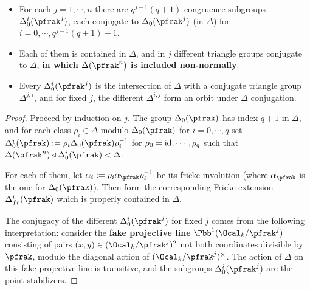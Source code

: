 \documentclass[11pt]{amsart}
\begin{document}
\begin{lemma}
	\begin{itemize}
		\item For each $j=1,\cdots,n$ there are $q^{j-1}(q+1)$ congruence subgroups $\Delta_0^i(\pfrak^j)$, each conjugate to $\Delta_0(\pfrak^j)$ (in $\Delta$) for $i=0,\cdots,q^{j-1}(q+1)-1$.
		\item  Each of them is contained in $\Delta$, and in $j$ different triangle groups conjugate to $\Delta$, \textbf{in which $\Delta(\pfrak^n)$ is included non-normally}.
		\item Every $\Delta_0^i(\pfrak^j)$ is the intersection of $\Delta$ with a conjugate triangle group $\Delta^{j,i}$, and for fixed $j$, the different $\Delta^{i,j}$ form an orbit under $\Delta$ conjugation.
	\end{itemize}
\end{lemma}
	\begin{proof}
		Proceed by induction on $j$. The group $\Delta_0(\pfrak)$ has index $q+1$ in $\Delta$, and for each class $\rho_i \in \Delta$ modulo $\Delta_0(\pfrak)$ for $i=0,\cdots, q$ set $\Delta_0^i(\pfrak):= \rho_i  \Delta_0(\pfrak) \rho_i^\inv$ for $\rho_0=\operatorname{id}, \cdots, \rho_q$ such that $\Delta(\pfrak^n) \triangleleft \Delta_0^i(\pfrak) < \Delta$.

		For each of them, let $\alpha_i:= \rho_i \alpha_\pfrak \rho_i^\inv$ be its fricke involution (where $\alpha_\pfrak$ is the one for $\Delta_0(\pfrak)$). Then form the corresponding Fricke extension $\Delta_{fr}^i(\pfrak)$ which is properly contained in $\Delta$.

		The conjugacy of the different $\Delta_0^i(\pfrak^j)$ for fixed $j$ comes from the following interpretation: consider the \textbf{fake projective line} $\Pbb^1(\Ocal_k/\pfrak^j)$ consisting of pairs $(x,y) \in (\Ocal_k / \pfrak^j)^2$ not both coordinates divisible by $\pfrak$, modulo the diagonal action of $(\Ocal_k / \pfrak^j)^\times $. The action of $\Delta$ on this fake projective line is transitive, and the subgroups $\Delta_0^i(\pfrak^j)$ are the point stabilizers.
	\end{proof}





\end{document}
